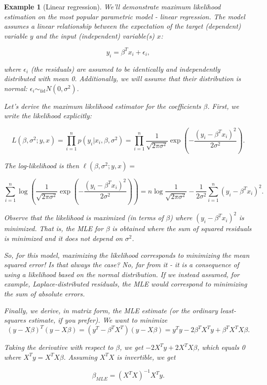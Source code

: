 \documentclass{book}
\theoremstyle{plain}%
\newtheorem{prototheorem}{Example}[section]
\newenvironment{cexample}
   {\colorlet{shadecolor}{gray!10}\begin{shaded}\begin{prototheorem}}
   {\end{prototheorem}\end{shaded}}
\theoremstyle{definition}
\begin{document}
\begin{cexample}[Linear regression] We'll demonstrate maximum likelihood estimation on the most popular parametric model - linear regression. The model assumes a linear relationship between the expectation of the target (dependent) variable $y$ and the input (independent) variable(s) $x$:

$$y_i = \beta^T x_i + \epsilon_i,$$

where $\epsilon_i$ (the residuals) are assumed to be identically and independently distributed with mean 0. Additionally, we will assume that their distribution is normal: $\epsilon_i \sim_\text{iid} N(0, \sigma^2)$.

Let's derive the maximum likelihood estimator for the coefficients $\beta$. First, we write the likelihood explicitly:

$$L(\beta, \sigma^2; y, x) = \prod_{i=1}^n p(y_i|x_i,\beta,\sigma^2) = \prod_{i=1}^n \frac{1}{\sqrt{2\pi\sigma^2}}\exp(-\frac{(y_i - \beta^Tx_i)^2}{2\sigma^2}).$$

The log-likelihood is then $\ell(\beta, \sigma^2; y, x) =$

$$\sum_{i=1}^n \log{\left(\frac{1}{\sqrt{2\pi\sigma^2}}\exp(-\frac{(y_i - \beta^Tx_i)^2}{2\sigma^2})\right)} = n\log\frac{1}{\sqrt{2\pi\sigma^2}} - \frac{1}{2\sigma^2}\sum_{i=1}^n (y_i - \beta^Tx_i)^2.$$

Observe that the likelihood is maximized (in terms of $\beta$) where $(y_i - \beta^Tx_i)^2$ is minimized. That is, the MLE for $\beta$ is obtained where the sum of squared residuals is minimized and it does not depend on $\sigma^2$.

So, for this model, maximizing the likelihood corresponds to minimizing the mean squared error! Is that always the case? No, far from it - it is a consequence of using a likelihood based on the normal distribution. If we instead assumed, for example, Laplace-distributed residuals, the MLE would correspond to minimizing the sum of absolute errors.

Finally, we derive, in matrix form, the MLE estimate (or the ordinary least-squares estimate, if you prefer). We want to minimize $$(y - X\beta)^T(y -  X\beta) = (y^T - \beta^TX^T)(y -  X\beta) = y^Ty - 2\beta^TX^Ty+ \beta^TX^TX\beta .$$

Taking the derivative with respect to $\beta$, we get $- 2X^Ty+ 2X^TX\beta$, which equals 0 where  $X^Ty = X^TX\beta$. Assuming $X^TX$ is invertible, we get

$$\beta_{MLE}=(X^TX)^{-1}X^Ty.$$
\end{cexample}
\end{document}
